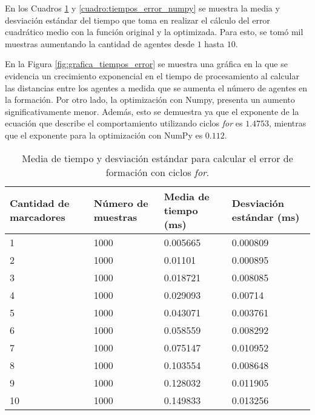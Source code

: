 En los Cuadros \ref{cuadro:tiempos_error_for} y \ref{cuadro:tiempos_error_numpy} se muestra la media y desviación estándar del tiempo que toma en realizar el cálculo del error cuadrático medio con la función original y la optimizada. Para esto, se tomó mil muestras aumentando la cantidad de agentes desde $1$ hasta $10$. 

En la Figura \ref{fig:grafica_tiempos_error} se muestra una gráfica en la que se evidencia un crecimiento exponencial en el tiempo de procesamiento al calcular las distancias entre los agentes a medida que se aumenta el número de agentes en la formación. Por otro lado, la optimización con Numpy, presenta un aumento significativamente menor. Además, esto se demuestra ya que el exponente de la ecuación que describe el comportamiento utilizando ciclos \textit{for} es $1.4753$, mientras que el exponente para la optimización con NumPy es $0.112$.

\begin{table}[H]
	\centering
	\resizebox{\textwidth}{!} {
	\begin{tabular}{|l|l|l|l|}
		\hline
		\textbf{Cantidad de marcadores} & \textbf{Número de muestras} & \textbf{Media de tiempo (ms)} & \textbf{Desviación estándar (ms)} \\ \hline
		1 & 1000 & 0.005665 & 0.000809 \\ \hline
		2 & 1000 & 0.01101 & 0.000895 \\ \hline
		3 & 1000 & 0.018721 & 0.008085 \\ \hline
		4 & 1000 & 0.029093 & 0.00714 \\ \hline
		5 & 1000 & 0.043071 & 0.003761 \\ \hline
		6 & 1000 & 0.058559 & 0.008292 \\ \hline
		7 & 1000 & 0.075147 & 0.010952 \\ \hline
		8 & 1000 & 0.103554 & 0.008648 \\ \hline
		9 & 1000 & 0.128032 & 0.011905 \\ \hline
		10 & 1000 & 0.149833 & 0.013256 \\ \hline
	\end{tabular}}
	\caption{Media de tiempo y desviación estándar para calcular el error de formación con ciclos \textit{for}.}
	\label{cuadro:tiempos_error_for}
\end{table}

